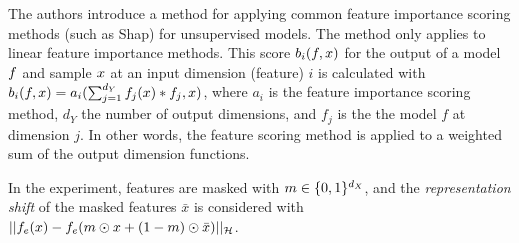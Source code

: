 \label{sec:claims}

    The authors introduce a method for applying common feature importance scoring methods (such as Shap) for unsupervised models. The method only applies to linear feature importance methods. This score $b_i(\boldmath{f},\boldmath{x})$ for the output of a model $\boldmath{f}$ and sample $\boldmath{x}$ at an input dimension (feature) $i$ is calculated with $b_i(\boldmath{f},\boldmath{x})=a_i(\sum_{j=1}^{d_Y}f_j(\boldmath{x})*f_j,\boldmath{x})$, where $a_i$ is the feature importance scoring method, $d_Y$ the number of output dimensions, and $f_j$ is the  the model $f$ at dimension $j$. In other words, the feature scoring method is applied to a weighted sum of the output dimension functions. 
    
    In the experiment, features are masked with $\boldmath{m} \in\{0,1\}^{d_X}$, and the \textit{representation shift} of the masked features $\bar{x}$ is considered with $||\boldmath{f}_e(\boldmath{x})-\boldmath{f}_e(\boldmath{m}\odot\boldmath{x}+(1-\boldmath{m})\odot\bar{x})||_\mathcal{H}$.
    
